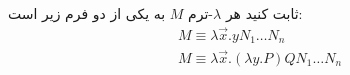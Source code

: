 ثابت کنید هر $\lambda$-ترم $M$ به یکی از دو فرم زیر است:
\begin{gather*}
    M \equiv \lambda \overrightarrow{x} . y N_1 \dots N_n \\
    M \equiv \lambda \overrightarrow{x} . (\lambda y. P) Q N_1 \dots N_n
\end{gather*}